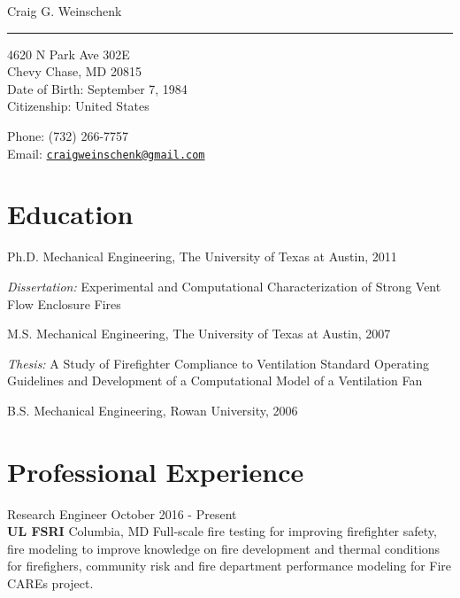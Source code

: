 \documentclass[10pt,letterpaper]{article}
\def\name{Craig G. Weinschenk}
\renewenvironment{itemize}{
  \begin{list}{}{
    \setlength{\leftmargin}{1.5em}
  }
}{
  \end{list}
}
\begin{document}
{\huge \name} \\
\noindent\rule{17cm}{0.4pt}


\vspace{0.25in}

\begin{minipage}[t]{0.5\textwidth}
  4620 N Park Ave 302E \\
  Chevy Chase, MD  20815\\
  Date of Birth: September 7, 1984 \\
  Citizenship: United States
\end{minipage}
\begin{minipage}[t]{0.5\textwidth}
  Phone: (732) 266-7757 \\
  Email: \href{mailto:craigweinschenk@gmail.com} {\tt craigweinschenk@gmail.com}\\

\end{minipage}

\section*{Education}

\begin{itemize}
  \item Ph.D. Mechanical Engineering, The University of Texas at Austin, 2011
    \begin{itemize}
      \item \textit{Dissertation:} Experimental and Computational Characterization of Strong Vent Flow Enclosure Fires
    \end{itemize}

  \item M.S. Mechanical Engineering, The University of Texas at Austin, 2007
    \begin{itemize}
      \item \textit{Thesis:} A Study of Firefighter Compliance to Ventilation Standard Operating Guidelines and Development of a Computational Model of a Ventilation Fan
    \end{itemize}

  \item B.S. Mechanical Engineering, Rowan University, 2006
\end{itemize}

\section*{Professional Experience}
Research Engineer \hfill October 2016 - Present \\
{\bf UL FSRI} \hfill Columbia, MD \vskip3pt
Full-scale fire testing for improving firefighter safety, fire modeling to improve knowledge on fire development and thermal conditions for firefighers, community risk and fire department performance modeling for Fire CAREs project. \\
\end{document}
